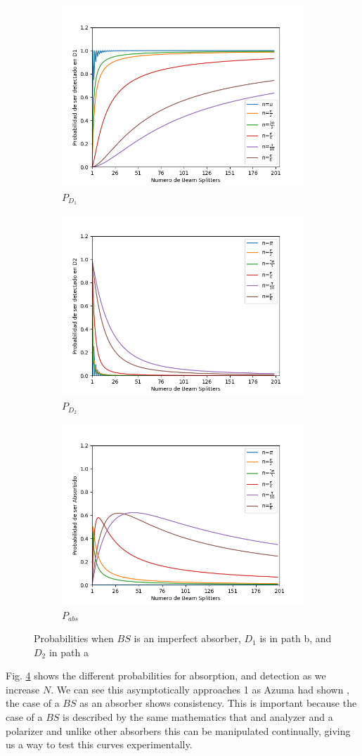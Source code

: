 \documentclass{book}
\begin{document}
 
\begin{figure}[h]
\centering
\begin{subfigure}[b]{0.3\linewidth}
\includegraphics[width=\linewidth,height=5 cm]{images/BS_Azuna.png}
\caption{$P_{D_{1}}$}
\label{fig:BS1}
\end{subfigure}
\begin{subfigure}[b]{0.3\linewidth}
\includegraphics[width=\linewidth,height=5 cm]{images/BS_AzunaD2.png}
\caption{$P_{D_{2}}$}
\label{fig:westminster_aerea}
\end{subfigure}
\begin{subfigure}[b]{0.3\linewidth}
\includegraphics[width=\linewidth,height=5 cm]{images/absorbido_azuna.png}
\caption{$P_{abs}$}
\label{fig:BS1}
\end{subfigure}
\caption{Probabilities when $BS$ is an imperfect absorber, $D_{1}$ is in path b, and $D_{2}$ in path a}
\label{Azuma1}
\end{figure}


Fig. \ref{Azuma1} shows the different probabilities for absorption, and detection as we increase $N$. We can see this asymptotically approaches 1 as Azuma had shown \cite{Azuma}, the case of a $BS$ as an absorber shows consistency. This is important because the case of a $BS$ is described by the same mathematics that and analyzer and a polarizer \cite{leonhardt_2003} and unlike other absorbers this can be manipulated continually, giving us a way to test this curves experimentally.
 
\end{document}
